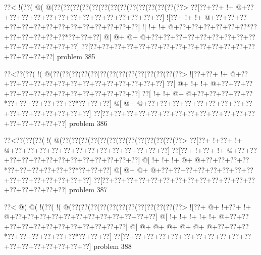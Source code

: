 \vbox{\vbox{\goo
\0??<\- !(\0??(\- @(\- @(\0??(\0??(\0??(\0??(\0??(\0??(\0??(\0??(\0??(\0??(\0??(\0??(\0??(\0??>
\0??[\0??+\0??+\- !+\- @+\0??+\0??+\0??+\0??+\0??+\0??+\0??+\0??+\0??+\0??+\0??+\0??+\0??+\0??]
\- ![\0??+\- !+\- !+\- @+\0??+\0??+\0??+\0??+\0??+\0??+\0??+\0??+\0??+\0??+\0??+\0??+\0??+\0??]
\- ![\- !+\- !+\- @+\0??+\0??+\0??+\0??+\0??+\0??*\0??+\0??+\0??+\0??+\0??+\0??*\0??+\0??+\0??]
\- @[\- @+\- @+\- @+\0??+\0??+\0??+\0??+\0??+\0??+\0??+\0??+\0??+\0??+\0??+\0??+\0??+\0??+\0??]
\0??[\0??+\0??+\0??+\0??+\0??+\0??+\0??+\0??+\0??+\0??+\0??+\0??+\0??+\0??+\0??+\0??+\0??+\0??]
}
\hfil problem 385\hfil\break
}



\vbox{\vbox{\goo
\0??<\0??(\0??(\- !(\- @(\0??(\0??(\0??(\0??(\0??(\0??(\0??(\0??(\0??(\0??(\0??(\0??(\0??(\0??>
\- ![\0??+\0??+\- !+\- @+\0??+\0??+\0??+\0??+\0??+\0??+\0??+\0??+\0??+\0??+\0??+\0??+\0??+\0??]
\0??[\- @+\- !+\- !+\- @+\0??+\0??+\0??+\0??+\0??+\0??+\0??+\0??+\0??+\0??+\0??+\0??+\0??+\0??]
\0??[\- !+\- !+\- @+\- @+\0??+\0??+\0??+\0??+\0??*\0??+\0??+\0??+\0??+\0??+\0??*\0??+\0??+\0??]
\- @[\- @+\- @+\0??+\0??+\0??+\0??+\0??+\0??+\0??+\0??+\0??+\0??+\0??+\0??+\0??+\0??+\0??+\0??]
\0??[\0??+\0??+\0??+\0??+\0??+\0??+\0??+\0??+\0??+\0??+\0??+\0??+\0??+\0??+\0??+\0??+\0??+\0??]
}
\hfil problem 386\hfil\break
}



\vbox{\vbox{\goo
\0??<\0??(\0??(\0??(\- !(\- @(\0??(\0??(\0??(\0??(\0??(\0??(\0??(\0??(\0??(\0??(\0??(\0??(\0??>
\0??[\0??+\- !+\0??+\- !+\- @+\0??+\0??+\0??+\0??+\0??+\0??+\0??+\0??+\0??+\0??+\0??+\0??+\0??]
\0??[\0??+\- !+\0??+\- !+\- @+\0??+\0??+\0??+\0??+\0??+\0??+\0??+\0??+\0??+\0??+\0??+\0??+\0??]
\- @[\- !+\- !+\- !+\- @+\- @+\0??+\0??+\0??+\0??*\0??+\0??+\0??+\0??+\0??+\0??*\0??+\0??+\0??]
\- @[\- @+\- @+\- @+\0??+\0??+\0??+\0??+\0??+\0??+\0??+\0??+\0??+\0??+\0??+\0??+\0??+\0??+\0??]
\0??[\0??+\0??+\0??+\0??+\0??+\0??+\0??+\0??+\0??+\0??+\0??+\0??+\0??+\0??+\0??+\0??+\0??+\0??]
}
\hfil problem 387\hfil\break
}



\vbox{\vbox{\goo
\0??<\- @(\- @(\- !(\0??(\- !(\- @(\0??(\0??(\0??(\0??(\0??(\0??(\0??(\0??(\0??(\0??(\0??(\0??>
\- ![\0??+\- @+\- !+\0??+\- !+\- @+\0??+\0??+\0??+\0??+\0??+\0??+\0??+\0??+\0??+\0??+\0??+\0??]
\- @[\- !+\- !+\- !+\- !+\- !+\- @+\0??+\0??+\0??+\0??+\0??+\0??+\0??+\0??+\0??+\0??+\0??+\0??]
\- @[\- @+\- @+\- @+\- @+\- @+\- @+\0??+\0??+\0??*\0??+\0??+\0??+\0??+\0??+\0??*\0??+\0??+\0??]
\0??[\0??+\0??+\0??+\0??+\0??+\0??+\0??+\0??+\0??+\0??+\0??+\0??+\0??+\0??+\0??+\0??+\0??+\0??]
}
\hfil problem 388\hfil\break
}



